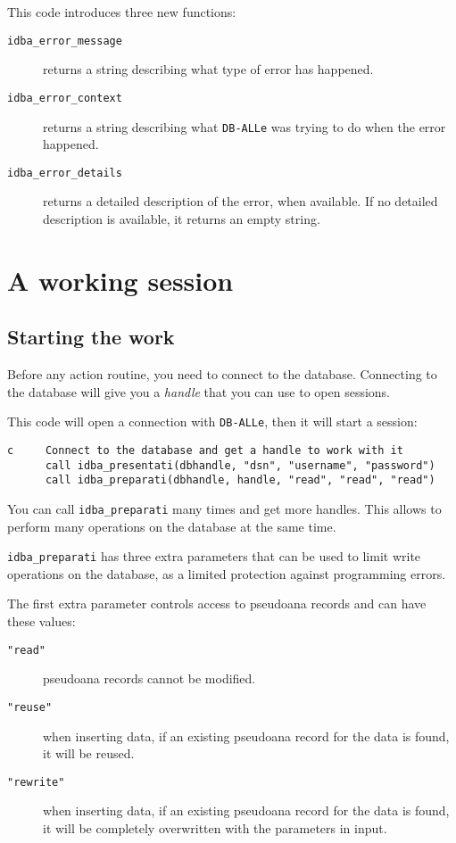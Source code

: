 \documentclass[final,12pt,a4paper,twoside]{book}
\newcommand{\dballe}{{\tt DB-ALLe}}
\begin{document}
This code introduces three new functions:

\begin{description}
\item[{\tt idba\_error\_message}]
  returns a string describing what type of error has happened.
\item[{\tt idba\_error\_context}]
  returns a string describing what \dballe{} was trying to do when the error
  happened.
\item[{\tt idba\_error\_details}]
  returns a detailed description of the error, when available.  If no detailed
  description is available, it returns an empty string.
\end{description}



\chapter {A working session}
\label{ch-work}

\section{Starting the work}

Before any action routine, you need to connect to the database.  Connecting to
the database will give you a \emph{handle} that you can use to open sessions.

This code will open a connection with \dballe{}, then it will start a session:

\label{fun-idba_presentati}
\label{fun-idba_preparati}

\begin{verbatim}
c     Connect to the database and get a handle to work with it
      call idba_presentati(dbhandle, "dsn", "username", "password")
      call idba_preparati(dbhandle, handle, "read", "read", "read")
\end{verbatim}

You can call {\tt idba\_preparati} many times and get more handles.  This allows
to perform many operations on the database at the same time.

{\tt idba\_preparati} has three extra parameters that can be used to limit
write operations on the database, as a limited protection against programming
errors.

The first extra parameter controls access to pseudoana records and can have
these values:

\begin{description}
\item[{\tt "read"}] pseudoana records cannot be modified.
\item[{\tt "reuse"}] when inserting data, if an existing pseudoana record for
                     the data is found, it will be reused.
\item[{\tt "rewrite"}] when inserting data, if an existing pseudoana record for
		     the data is found, it will be completely overwritten with
		     the parameters in input.
\end{description}
\end{document}
